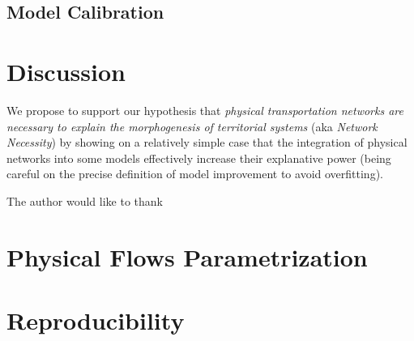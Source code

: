 \documentclass[Royal,sageh,times]{sagej}
\begin{document}
\subsection{Model Calibration}









\section{Discussion}

% 
%
%






We propose to support our hypothesis that \textit{physical transportation networks are necessary to explain the morphogenesis of territorial systems} (aka \textit{Network Necessity}) by showing on a relatively simple case that the integration of physical networks into some models effectively increase their explanative power (being careful on the precise definition of model improvement to avoid overfitting).









\begin{acks}
The author would like to thank
\end{acks}












\section*{Physical Flows Parametrization}



\section*{Reproducibility}

\end{document}
